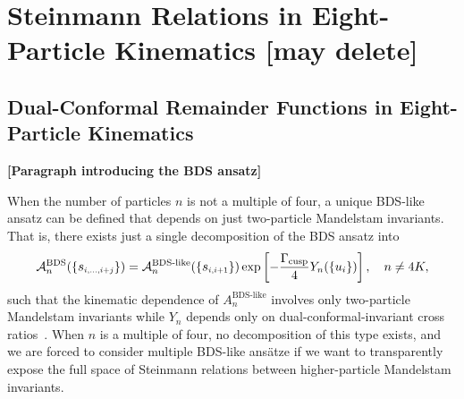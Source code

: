 \documentclass[11pt]{article}
\def\draftnote#1{{\bf [#1]}}
\def\mand#1{\scaleto{s}{4.6pt}_{\scaleto{#1}{5.2pt}}}
\begin{document}
\section{Steinmann Relations in Eight-Particle Kinematics [may delete]}

\subsection{Dual-Conformal Remainder Functions in Eight-Particle Kinematics}

\draftnote{Paragraph introducing the BDS ansatz}

When the number of particles $n$ is not a multiple of four, a unique BDS-like ansatz can be defined that depends on just two-particle Mandelstam invariants. That is, there exists just a single decomposition of the BDS ansatz into
\begin{equation}
{\cal A}_n^{\text{BDS}}(\{\mand{i,\dots,i+j}\}) = {\cal A}_n^{\text{BDS-like}}(\{\mand{i,i+1}\}) \exp \left[ - \frac{\Gamma_{\text{cusp}}}{4} Y_{n}(\{u_i\})  \right], \quad n\neq4K,
\end{equation}
such that the kinematic dependence of $A^{\text{BDS-like}}_{n}$ involves only two-particle Mandelstam invariants while $Y_{n}$ depends only on dual-conformal-invariant cross ratios~\cite{Yang:2010az}. %
When $n$ is a multiple of four, no decomposition of this type exists, and we are forced to consider multiple BDS-like ans\"atze if we want to transparently expose the full space of Steinmann relations between higher-particle Mandelstam invariants. 
\end{document}
